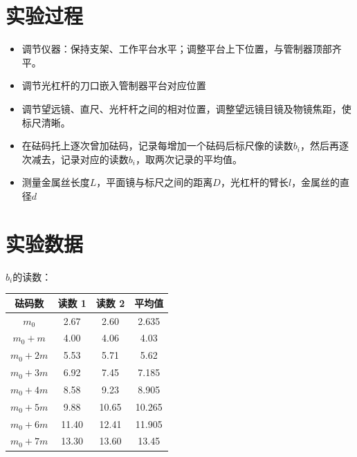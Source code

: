 \documentclass[a4paper]{ltxdoc}
\begin{document}
\begin{multicols}{2}
    \section{实验过程}

    \begin{itemize}
        \item 调节仪器：保持支架、工作平台水平；调整平台上下位置，与管制器顶部齐平。
        \item 调节光杠杆的刀口嵌入管制器平台对应位置
        \item 调节望远镜、直尺、光杆杆之间的相对位置，调整望远镜目镜及物镜焦距，使标尺清晰。
        \item 在砝码托上逐次曾加砝码，记录每增加一个砝码后标尺像的读数$b_i$，然后再逐次减去，记录对应的读数$b_i$，取两次记录的平均值。
        \item 测量金属丝长度$L$，平面镜与标尺之间的距离$D$，光杠杆的臂长$l$，金属丝的直径$d$
    \end{itemize}

    \section{实验数据}

    $b_i$的读数：

    \smallskip

    \begin{tabular}{|c|c|c|c|}
        \hline \textbf{砝码数} & \textbf{读数 1} & \textbf{读数 2} & \textbf{平均值} \\
        \hline $m_0$           & 2.67            & 2.60            & 2.635           \\
        \hline $m_0 + m$       & 4.00            & 4.06            & 4.03            \\
        \hline $m_0 + 2m$      & 5.53            & 5.71            & 5.62            \\
        \hline $m_0 + 3m$      & 6.92            & 7.45            & 7.185           \\
        \hline $m_0 + 4m$      & 8.58            & 9.23            & 8.905           \\
        \hline $m_0 + 5m$      & 9.88            & 10.65           & 10.265          \\
        \hline $m_0 + 6m$      & 11.40           & 12.41           & 11.905          \\
        \hline $m_0 + 7m$      & 13.30           & 13.60           & 13.45           \\\hline
    \end{tabular}


\end{multicols}
\end{document}
